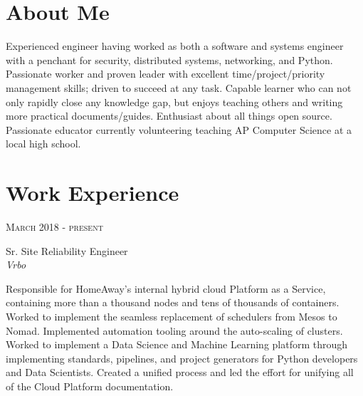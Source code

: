 \documentclass[10pt]{article} %
\begin{document}
\begin{minipage}[t]{0.5\textwidth} %
\vspace{0pt} %
	
\section{About Me}
Experienced engineer having worked as both a software and systems engineer with a penchant for security, distributed systems, networking, and Python. Passionate worker and proven leader with excellent time/project/priority management skills; driven to succeed at any task. Capable learner who can not only rapidly close any knowledge gap, but enjoys teaching others and writing more practical documents/guides. Enthusiast about all things open source. Passionate educator currently volunteering teaching AP Computer Science at a local high school.


\section{Work Experience} 


{\raggedleft\textsc{March 2018 - present}\par}

{\raggedright\large Sr. Site Reliability Engineer\\
\textit{Vrbo}\\[5pt]}

\normalsize{Responsible for HomeAway's internal hybrid cloud Platform as a Service, containing more than a thousand nodes and tens of thousands of containers. Worked to implement the seamless replacement of schedulers from Mesos to Nomad. Implemented automation tooling around the auto-scaling of clusters. Worked to implement a Data Science and Machine Learning platform through implementing standards, pipelines, and project generators for Python developers and Data Scientists. Created a unified process and led the effort for unifying all of the Cloud Platform documentation.}\\


\end{minipage}
\end{document}

